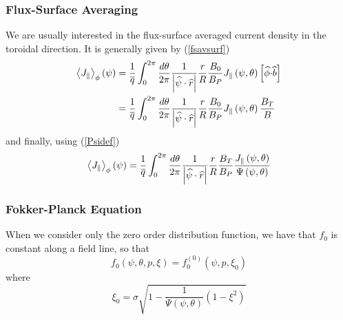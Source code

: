 \subsubsection{Flux-Surface Averaging}

We are usually interested in the flux-surface averaged current density in
the toroidal direction. It is generally given by (\ref{fsavsurf})
\begin{align}
\left\langle J_{\Vert}\right\rangle _{\phi}\left( \psi\right) & =\frac {1}{%
\overline{q}}\int_{0}^{2\pi}\frac{d\theta}{2\pi}\frac{1}{\left| \widehat{\psi%
}\cdot\widehat{r}\right| }\frac{r}{R}\frac{B_{0}}{B_{P}}J_{\Vert}\left(
\psi,\theta\right) \left[ \widehat{\phi}\mathbf{\cdot }\widehat{b}\right]
\nonumber \\
& =\frac{1}{\overline{q}}\int_{0}^{2\pi}\frac{d\theta}{2\pi}\frac{1}{\left|
\widehat{\psi}\cdot\widehat{r}\right| }\frac{r}{R}\frac{B_{0}}{B_{P}}
J_{\Vert}\left( \psi,\theta\right) \frac{B_{T}}{B}
\end{align}
and finally, using (\ref{Psidef})
\begin{equation}
\left\langle J_{\Vert}\right\rangle _{\phi}\left( \psi\right) =\frac {1}{%
\overline{q}}\int_{0}^{2\pi}\frac{d\theta}{2\pi}\frac{1}{\left| \widehat{\psi%
}\cdot\widehat{r}\right| }\frac{r}{R}\frac{B_{T}}{B_{P}}\frac{
J_{\Vert}\left( \psi,\theta\right) }{\Psi\left( \psi,\theta\right) }
\end{equation}

\subsubsection{Fokker-Planck Equation}

When we consider only the zero order distribution function, we have that $%
f_{0}$ is constant along a field line, so that
\begin{equation}
f_{0}\left( \psi,\theta,p,\xi\right) =f_{0}^{(0)}\left( \psi,p,\xi
_{0}\right)
\end{equation}
where
\begin{equation}
\xi_{0}=\sigma\sqrt{1-\frac{1}{\Psi\left( \psi,\theta\right) }\left(
1-\xi^{2}\right) }  \label{xi0}
\end{equation}

